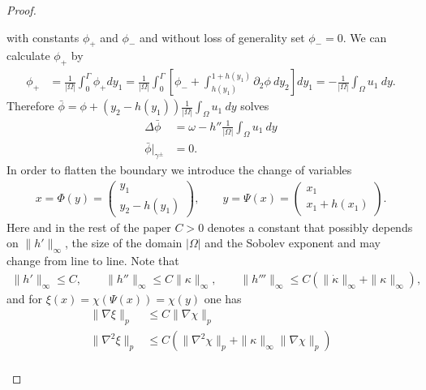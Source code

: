 \documentclass{article}
\theoremstyle{definition}
\theoremstyle{definition}
\begin{document}
\begin{proof}
\begin{itemize}
    with constants $\phi_+$ and $\phi_-$ and without loss of generality set $\phi_-=0$. We can calculate $\phi_+$ by
    \begin{align*}
        \phi_+ &= \frac{1}{|\Omega|} \int_0^\Gamma \phi_+ dy_1 = \frac{1}{|\Omega|} \int_0^\Gamma \left[\phi_- + \int_{h(y_1)}^{1+h(y_1)} \partial_2 \phi\ dy_2\right] dy_1 = -\frac{1}{|\Omega|}\int_{\Omega}u_1 \ dy.
    \end{align*}
    Therefore $\bar \phi = \phi + (y_2-h(y_1))\frac{1}{|\Omega|}\int_{\Omega} u_1\ dy$ solves
    \begin{equation*}
        \begin{aligned}
            \Delta \bar\phi &= \omega - h''\frac{1}{|\Omega|}\int_{\Omega} u_1 \ dy
            \\
            \bar\phi\vert_{\gamma^\pm} &= 0.
        \end{aligned}
    \end{equation*}
    In order to flatten the boundary we introduce the change of variables
    \begin{align*}
        x=\Phi(y) = \begin{pmatrix}y_1\\y_2 - h(y_1)\end{pmatrix}, \qquad y=\Psi(x) = \begin{pmatrix}x_1\\x_1 + h(x_1)\end{pmatrix}.
    \end{align*}
    Here and in the rest of the paper $C>0$ denotes a constant that possibly depends on $\|h'\|_{\infty}$, the size of the domain $|\Omega|$ and the Sobolev exponent and may change from line to line. Note that
    \begin{align*}
        \|h'\|_\infty \leq C,\qquad \|h''\|_\infty \leq C\|\kappa\|_\infty,\qquad \|h'''\|_\infty\leq C (\|\dot\kappa\|_\infty+\|\kappa\|_\infty),
    \end{align*}
    and for $\xi(x)=\chi(\Psi(x))=\chi(y)$ one has
    \begin{equation}
        \label{changeOfVariablesDerivative}
        \begin{aligned}
            \|\nabla \xi\|_p&\leq C\|\nabla\chi\|_p
            \\
            \|\nabla^2\xi\|_p&\leq C(\|\nabla^2\chi\|_p+\|\kappa\|_\infty \|\nabla \chi\|_p)
            \\

\end{aligned}
\end{equation}
\end{itemize}
\end{proof}
\end{document}
